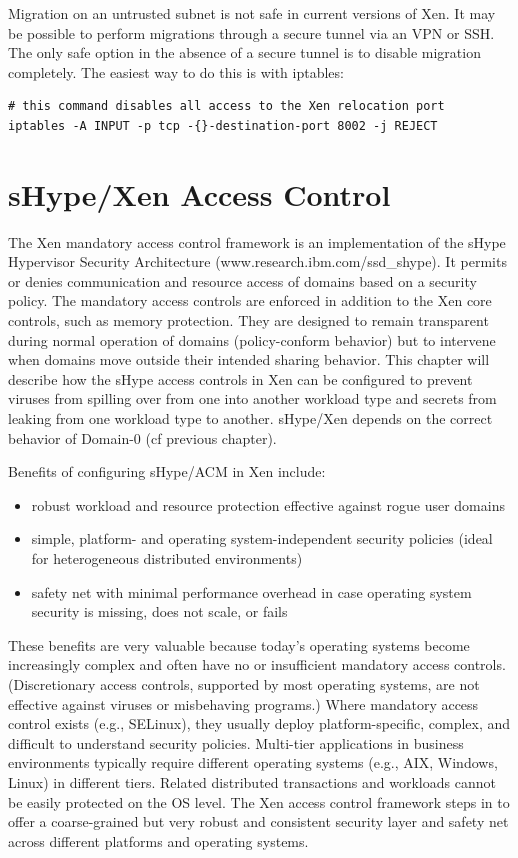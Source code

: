 \documentclass[11pt,twoside,final,openright]{report}
\begin{document}
Migration on an untrusted subnet is not safe in current versions of Xen.
It may be possible to perform migrations through a secure tunnel via an
VPN or SSH. The only safe option in the absence of a secure tunnel is to
disable migration completely. The easiest way to do this is with
iptables:

\begin{verbatim}
# this command disables all access to the Xen relocation port
iptables -A INPUT -p tcp -{}-destination-port 8002 -j REJECT
\end{verbatim}

\chapter{sHype/Xen Access Control}
The Xen mandatory access control framework is an implementation of the
sHype Hypervisor Security Architecture
(www.research.ibm.com/ssd\_shype). It permits or denies communication
and resource access of domains based on a security policy. The
mandatory access controls are enforced in addition to the Xen core
controls, such as memory protection.  They are designed to remain
transparent during normal operation of domains (policy-conform
behavior) but to intervene when domains move outside their intended
sharing behavior.  This chapter will describe how the sHype access
controls in Xen can be configured to prevent viruses from spilling
over from one into another workload type and secrets from leaking from
one workload type to another. sHype/Xen depends on the correct
behavior of Domain-0 (cf previous chapter).

Benefits of configuring sHype/ACM in Xen include:
\begin{itemize}
\item robust workload and resource protection effective against rogue
  user domains
\item simple, platform- and operating system-independent security
  policies (ideal for heterogeneous distributed environments)
\item safety net with minimal performance overhead in case operating
  system security is missing, does not scale, or fails
\end{itemize}

These benefits are very valuable because today's operating systems
become increasingly complex and often have no or insufficient
mandatory access controls.  (Discretionary access controls, supported
by most operating systems, are not effective against viruses or
misbehaving programs.)  Where mandatory access control exists (e.g.,
SELinux), they usually deploy platform-specific, complex, and difficult
to understand security policies.  Multi-tier applications in business
environments typically require different operating systems
(e.g., AIX, Windows, Linux) in different tiers. Related distributed
transactions and workloads cannot be easily protected on the OS level.
The Xen access control framework steps in to offer a coarse-grained
but very robust and consistent security layer and safety net across
different platforms and operating systems.
\end{document}
